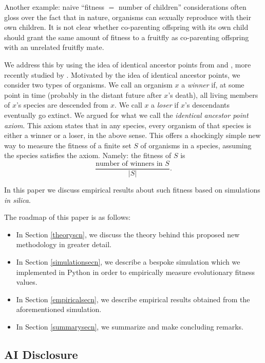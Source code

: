 \documentclass{article}
\begin{document}
Another example: naive ``fitness $=$ number of children'' considerations
often gloss over
the fact that in nature, organisms can sexually reproduce with their own children.
It is not clear whether co-parenting offspring
with its own child should grant the same
amount of fitness to a fruitfly as co-parenting offspring
with an unrelated fruitfly mate.

We address this by using the idea of identical ancestor points from
\cite{chang1999recent} and \cite{rohde2004modelling},
more recently studied by \cite{alexander2026specieslike}.
Motivated by the idea of identical
ancestor points, we consider two types of organisms. We call an organism $x$ a
\emph{winner} if, at some point in time (probably in the distant future after
$x$'s death), all living members of $x$'s species are descended from $x$.
We call $x$ a \emph{loser} if $x$'s descendants eventually go extinct.
We argued \cite{alexander2026specieslike} for what we call
the \emph{identical ancestor point axiom}.
This axiom states that in any species, every organism of that species is either
a winner or a loser, in the above sense. This offers a shockingly simple
new way to measure the fitness of a finite set $S$ of organisms in a
species, assuming the species satisfies the axiom. Namely: the fitness of
$S$ is
\[
    \frac{\mbox{number of winners in $S$}}{|S|}.
\]

In this paper we discuss empirical results about such fitness based on
simulations \emph{in silica}.

The roadmap of this paper is as follows:

\begin{itemize}
    \item
    In Section \ref{theoryscn},
    we discuss the theory behind this proposed new methodology
    in greater detail.
    \item
    In Section \ref{simulationsecn},
    we describe a bespoke simulation which we implemented
    in Python in order to empirically measure evolutionary fitness values.
    \item
    In Section \ref{empiricalsecn},
    we describe empirical results obtained from the aforementioned
    simulation.
    \item
    In Section \ref{summarysecn}, we summarize and make concluding remarks.
\end{itemize}

\subsection{AI Disclosure}
\end{document}
